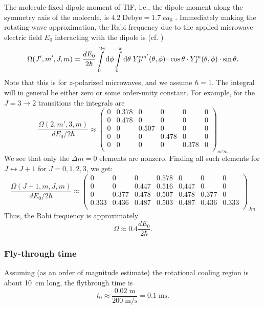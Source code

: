The molecule-fixed dipole moment of TlF, i.e., the dipole moment along the
symmetry axis of the molecule, is $4.2\;\text{Debye}=1.7\;ea_0$
\cite[Table~1]{wilkening1984search}. Immediately making the rotating-wave
approximation, the Rabi frequency due to the applied microwave electric field
$E_0$ interacting with the dipole is (cf.  \cite[eqn~7.81]{budker2004atomic})
%
\[
    \Omega(J',m',J,m)=\frac{dE_0}{2\hbar}
    \int\limits_0^{2\pi}\mathrm{d}\phi
    \int\limits_0^{\pi}\mathrm{d}\theta\;
    Y_{J'}^{*m'}(\theta,\phi)
    \cdot\cos\theta\cdot
    Y_J^m(\theta,\phi)
    \cdot\sin\theta.
\]
%
Note that this is for $z$-polarized microwaves, and we assume $\hbar=1$. The
integral will in general be either zero or some order-unity constant. For
example, for the $J=3\rightarrow2$ transitions the integrals are
%
\[
    \frac{\Omega(2,m',3,m)}{dE_0/2\hbar}
    \approx
    \begin{pmatrix}
        0 & 0.378 & 0     & 0     & 0     & 0\\
        0 & 0.478 & 0     & 0     & 0     & 0\\
        0 & 0     & 0.507 & 0     & 0     & 0\\
        0 & 0     & 0     & 0.478 & 0     & 0\\
        0 & 0     & 0     & 0     & 0.378 & 0\\
    \end{pmatrix}_{m'm}
\]
%
We see that only the $\Delta m=0$ elements are nonzero. Finding all such
elements for $J\leftrightarrow J+1$ for $J=0,1,2,3$, we get:
\[
    \frac{\Omega(J+1,m,J,m)}{dE_0/2\hbar}
    \approx
    \begin{pmatrix}
        0     & 0     & 0     & 0.578 & 0     & 0     & 0    \\
        0     & 0     & 0.447 & 0.516 & 0.447 & 0     & 0    \\
        0     & 0.377 & 0.478 & 0.507 & 0.478 & 0.377 & 0    \\
        0.333 & 0.436 & 0.487 & 0.503 & 0.487 & 0.436 & 0.333\\
    \end{pmatrix}_{Jm}
\]
%
Thus, the Rabi frequency is approximately
%
\[
    \Omega\approx0.4\frac{dE_0}{2\hbar}.
\]

\subsubsection{Fly-through time}

Assuming (as an order of magnitude estimate) the rotational cooling region is
about 10~cm long, the flythrough time is
%
\[
    t_0\approx\frac{0.02\;\text{m}}{200\;\text{m/s}}=0.1\;\text{ms}.
\]


